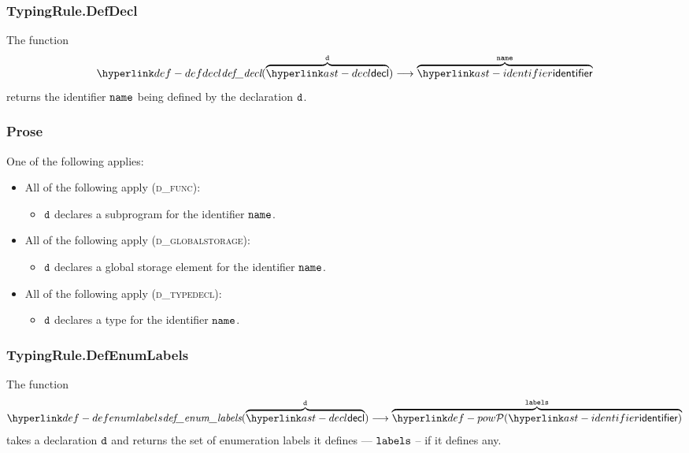 \subsubsection{TypingRule.DefDecl\label{sec:TypingRule.DefDecl}}
\hypertarget{def-defdecl}{}
The function
\[
\defdecl(\overname{\decl}{\vd}) \aslto \overname{\identifier}{\name}
\]
returns the identifier $\texttt{name}$ being defined by the declaration $\texttt{d}$.

\subsubsection{Prose}
One of the following applies:
\begin{itemize}
  \item All of the following apply (\textsc{d\_func}):
  \begin{itemize}
    \item $\texttt{d}$ declares a subprogram for the identifier $\texttt{name}$.
  \end{itemize}

  \item All of the following apply (\textsc{d\_globalstorage}):
  \begin{itemize}
    \item $\texttt{d}$ declares a global storage element for the identifier $\texttt{name}$.
  \end{itemize}

  \item All of the following apply (\textsc{d\_typedecl}):
  \begin{itemize}
    \item $\texttt{d}$ declares a type for the identifier $\texttt{name}$.
  \end{itemize}
\end{itemize}


\subsubsection{TypingRule.DefEnumLabels \label{sec:TypingRule.DefEnumLabels}}
\hypertarget{def-defenumlabels}{}
The function
\[
\defenumlabels(\overname{\decl}{\vd}) \aslto \overname{\pow{\identifier}}{\vlabels}
\]
takes a declaration $\texttt{d}$ and returns the set of enumeration labels it defines --- $\texttt{labels}$ --
if it defines any.

